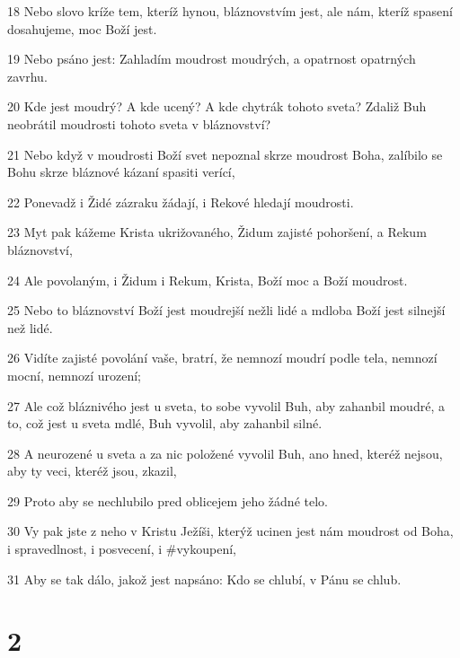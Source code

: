 \par 18 Nebo slovo kríže tem, kteríž hynou, bláznovstvím jest, ale nám, kteríž spasení dosahujeme, moc Boží jest.
\par 19 Nebo psáno jest: Zahladím moudrost moudrých, a opatrnost opatrných zavrhu.
\par 20 Kde jest moudrý? A kde ucený? A kde chytrák tohoto sveta? Zdaliž Buh neobrátil moudrosti tohoto sveta v bláznovství?
\par 21 Nebo když v moudrosti Boží svet nepoznal skrze moudrost Boha, zalíbilo se Bohu skrze bláznové kázaní spasiti verící,
\par 22 Ponevadž i Židé zázraku žádají, i Rekové hledají moudrosti.
\par 23 Myt pak kážeme Krista ukrižovaného, Židum zajisté pohoršení, a Rekum bláznovství,
\par 24 Ale povolaným, i Židum i Rekum, Krista, Boží moc a Boží moudrost.
\par 25 Nebo to bláznovství Boží jest moudrejší nežli lidé a mdloba Boží jest silnejší než lidé.
\par 26 Vidíte zajisté povolání vaše, bratrí, že nemnozí moudrí podle tela, nemnozí mocní, nemnozí urození;
\par 27 Ale což bláznivého jest u sveta, to sobe vyvolil Buh, aby zahanbil moudré, a to, což jest u sveta mdlé, Buh vyvolil, aby zahanbil silné.
\par 28 A neurozené u sveta a za nic položené vyvolil Buh, ano hned, kteréž nejsou, aby ty veci, kteréž jsou, zkazil,
\par 29 Proto aby se nechlubilo pred oblicejem jeho žádné telo.
\par 30 Vy pak jste z neho v Kristu Ježíši, kterýž ucinen jest nám moudrost od Boha, i spravedlnost, i posvecení, i #vykoupení,
\par 31 Aby se tak dálo, jakož jest napsáno: Kdo se chlubí, v Pánu se chlub.

\chapter{2}

